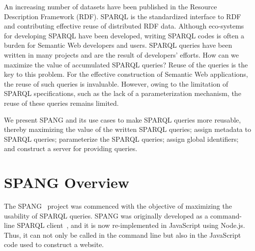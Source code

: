 \documentclass[runningheads]{llncs}
\begin{document}
An increasing number of datasets have been published in the Resource Description Framework (RDF).
SPARQL is the standardized interface to RDF and contributing effective reuse of distributed RDF data. 
Although eco-systems for developing SPARQL have been developed, writing SPARQL codes is often a burden for Semantic Web developers and users. 
SPARQL queries have been written in many projects and are the result of developers' efforts. 
How can we maximize the value of accumulated SPARQL queries?
Reuse of the queries is the key to this problem.
For the effective construction of Semantic Web applications, the reuse of such queries is invaluable.
However, owing to the limitation of SPARQL specifications, such as the lack of a parameterization mechanism, the reuse of these queries remains limited. 


We present SPANG and its use cases to make SPARQL queries more reusable, thereby maximizing the value of the written SPARQL queries;
assign metadata to SPARQL queries;
parameterize the SPARQL queries;
assign global identifiers; and
construct a server for providing queries.


\section{SPANG Overview}

The SPANG~\cite{spang} project was commenced with the objective of maximizing the usability of SPARQL queries. 
SPANG was originally developed as a command-line SPARQL client~\cite{spang}, and it is now re-implemented in JavaScript using Node.js. Thus, it can not only be called in the command line but also in the JavaScript code used to construct a website.
\end{document}
